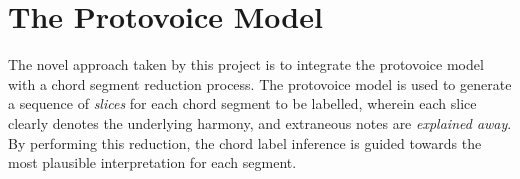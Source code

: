 \documentclass[12pt,a4paper,twoside,openany]{report} \usepackage[pdfborder={0 0 0}]{hyperref}    %
\theoremstyle{definition} \newtheorem{definition}{Definition}[section]
\begin{document}


\section{The Protovoice Model}
\label{sec:protovoiceModel}

The novel approach taken by this project is to integrate the protovoice model with a chord segment reduction process.
The protovoice model is used to generate a sequence of \textit{slices} for each chord segment to be labelled, wherein
each slice clearly denotes the underlying harmony, and extraneous notes are \textit{explained away}. 
By performing this reduction, the chord label inference is guided towards the most plausible interpretation for each segment. 


%
%
%
\end{document}
